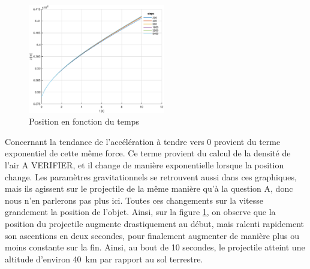 \documentclass[a4paper,12pt,twoside]{article}
\begin{document}
\begin{figure}
	\vspace{-20pt}
	\includegraphics[width=0.53\textwidth]{graphs/zB.eps}
	\vspace{-15pt}
	\caption{Position en fonction du temps}
	\vspace{-10pt}
	\label{fig:B-zt}
\end{figure}

Concernant la tendance de l'accélération à tendre vers 0 provient du terme exponentiel de cette même force. Ce terme provient du calcul de la densité de l'air A VERIFIER, et il change de manière exponentielle lorsque la position change. Les paramètres gravitationnels se retrouvent aussi dans ces graphiques, mais ils agissent sur le projectile de la même manière qu'à la question A, donc nous n'en parlerons pas plus ici.
Toutes ces changements sur la vitesse grandement la position de l'objet. Ainsi, sur la figure \ref{fig:B-zt}, on observe que la position du projectile augmente drastiquement au début, mais ralenti rapidement son ascentions en deux secondes, pour finalement augmenter de manière plus ou moins constante sur la fin. Ainsi, au bout de 10 secondes, le projectile atteint une altitude d'environ \SI{40}{\kilo\meter} par rapport au sol terrestre.\\
\end{document}
